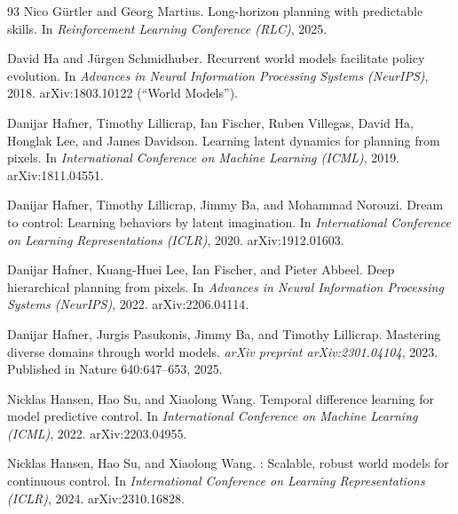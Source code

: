 \begin{thebibliography}{93}
Nico G{\"u}rtler and Georg Martius.
\newblock Long-horizon planning with predictable skills.
\newblock In \emph{Reinforcement Learning Conference (RLC)}, 2025.

David Ha and J{\"u}rgen Schmidhuber.
\newblock Recurrent world models facilitate policy evolution.
\newblock In \emph{Advances in Neural Information Processing Systems
  (NeurIPS)}, 2018.
\newblock arXiv:1803.10122 (``World Models'').

Danijar Hafner, Timothy Lillicrap, Ian Fischer, Ruben Villegas, David Ha,
  Honglak Lee, and James Davidson.
\newblock Learning latent dynamics for planning from pixels.
\newblock In \emph{International Conference on Machine Learning (ICML)}, 2019.
\newblock arXiv:1811.04551.

Danijar Hafner, Timothy Lillicrap, Jimmy Ba, and Mohammad Norouzi.
\newblock Dream to control: Learning behaviors by latent imagination.
\newblock In \emph{International Conference on Learning Representations
  (ICLR)}, 2020.
\newblock arXiv:1912.01603.

Danijar Hafner, Kuang-Huei Lee, Ian Fischer, and Pieter Abbeel.
\newblock Deep hierarchical planning from pixels.
\newblock In \emph{Advances in Neural Information Processing Systems
  (NeurIPS)}, 2022.
\newblock arXiv:2206.04114.

Danijar Hafner, Jurgis Pasukonis, Jimmy Ba, and Timothy Lillicrap.
\newblock Mastering diverse domains through world models.
\newblock \emph{arXiv preprint arXiv:2301.04104}, 2023.
\newblock Published in Nature 640:647--653, 2025.

Nicklas Hansen, Hao Su, and Xiaolong Wang.
\newblock Temporal difference learning for model predictive control.
\newblock In \emph{International Conference on Machine Learning (ICML)}, 2022.
\newblock arXiv:2203.04955.

Nicklas Hansen, Hao Su, and Xiaolong Wang.
: Scalable, robust world models for continuous control.
\newblock In \emph{International Conference on Learning Representations
  (ICLR)}, 2024.
\newblock arXiv:2310.16828.


\end{thebibliography}
